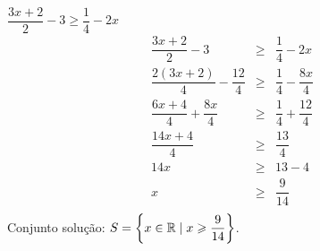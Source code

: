  \begin{exem}
 $\dfrac{3x+2}{2} - 3 \geqslant \dfrac{1}{4} - 2x$ 
 \begin{eqnarray*}
  \dfrac{3x+2}{2} - 3 &\geqslant & \dfrac{1}{4} - 2x \\
  \dfrac{2(3x+2)}{4} - \dfrac{12}{4} &\geqslant & \dfrac{1}{4} - \dfrac{8x}{4} \\
  \dfrac{6x+4}{4} + \dfrac{8x}{4} &\geqslant & \dfrac{1}{4} + \dfrac{12}{4} \\
  \dfrac{14x+4}{4}  &\geqslant & \dfrac{13}{4} \\
  14x  &\geqslant & 13 - 4\\
  x  &\geqslant & \dfrac{9}{14}\\
  \end{eqnarray*}
  Conjunto solução: $S= \left\{x \in \mathbb{R} \mid x \geqslant \dfrac{9}{14} \right\}$.
 \end{exem}
 
 



